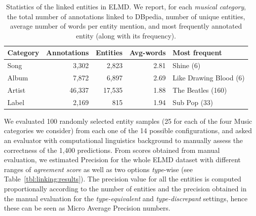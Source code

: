 \begin{table}[]
\scriptsize
\small
\centering
\def\arraystretch{1.2}
	\begin{tabular}{l r r r l}
\hline
\textbf{Category} & \textbf{Annotations} & \textbf{Entities} & \textbf{Avg-words} & \textbf{Most frequent} \\
\hline
Song & 3,302 & 2,823 & 2.81 & Shine (6) \\
Album & 7,872 & 6,897 & 2.69 & Like Drawing Blood (6) \\
Artist & 46,337 & 17,535 & 1.88 & The Beatles (160) \\
Label & 2,169 & 815 & 1.94 & Sub Pop (33) \\
\hline
	\end{tabular}
	\caption[Statistics of the linked entities in ELMD.]{Statistics of the linked entities in ELMD. We report, for each \textit{musical category}, the total number of annotations linked to DBpedia, number of unique entities, average number of words per entity mention, and most frequently annotated entity (along with its frequency).}
	\label{tbl:linking:statistics}
\end{table}


We evaluated 100 randomly selected entity samples (25 for each of the four Music categories we consider) from each one of the 14 possible configurations, and asked an eva\-luator with computational linguistics background to manually assess the correctness of the 1,400 predictions. From scores obtained from manual evaluation, we estimated Precision for the whole \textsc{ELMD} dataset with different ranges of \textit{agreement score} as well as two options \textit{type}-wise (see Table~\ref{tbl:linking:results}). The precision value for all the entities is computed proportionally according to the number of entities and the precision obtained in the manual evaluation for the \textit{type-equivalent} and \textit{type-discrepant} settings, hence these can be seen as Micro Average Precision numbers.

